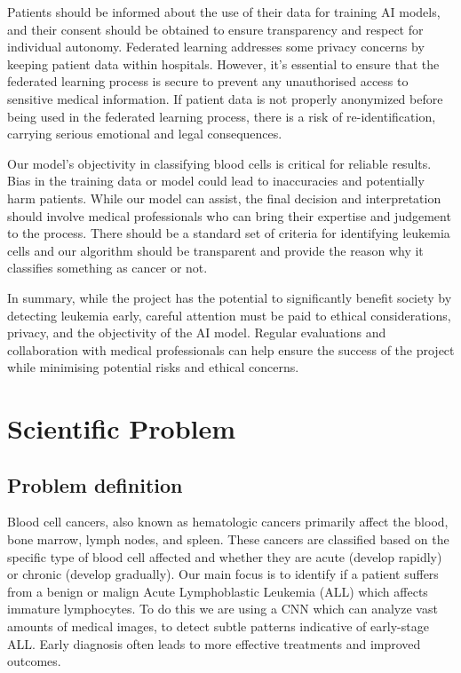 \documentclass[runningheads,a4paper,11pt]{report}
\begin{document}
Patients should be informed about the use of their data for training AI models, and their consent should be obtained to ensure transparency and respect for individual autonomy. Federated learning addresses some privacy concerns by keeping patient data within hospitals. However, it's essential to ensure that the federated learning process is secure to prevent any unauthorised access to sensitive medical information. If patient data is not properly anonymized before being used in the federated learning process, there is a risk of re-identification, carrying serious emotional and legal consequences.



Our model's objectivity in classifying blood cells is critical for reliable results. Bias in the training data or model could lead to inaccuracies and potentially harm patients. While our model can assist, the final decision and interpretation should involve medical professionals who can bring their expertise and judgement to the process. There should be a standard set of criteria for identifying leukemia cells and our algorithm should be transparent and provide the reason why it classifies something as cancer or not.

In summary, while the project has the potential to significantly benefit society by detecting leukemia early, careful attention must be paid to ethical considerations, privacy, and the objectivity of the AI model. Regular evaluations and collaboration with medical professionals can help ensure the success of the project while minimising potential risks and ethical concerns.

\chapter{Scientific Problem}
\label{section:scientificProblem}


\section{Problem definition}
\label{section:problemDefinition}

Blood cell cancers, also known as hematologic cancers primarily affect the blood, bone marrow, lymph nodes, and spleen. These cancers are classified based on the specific type of blood cell affected and whether they are acute (develop rapidly) or chronic (develop gradually). Our main focus is to identify if a patient suffers from a benign or malign  Acute Lymphoblastic Leukemia (ALL) which affects immature lymphocytes. To do this we are using a CNN which  can analyze vast amounts of medical images, to detect subtle patterns indicative of early-stage ALL. Early diagnosis often leads to more effective treatments and improved outcomes. 
\end{document}
